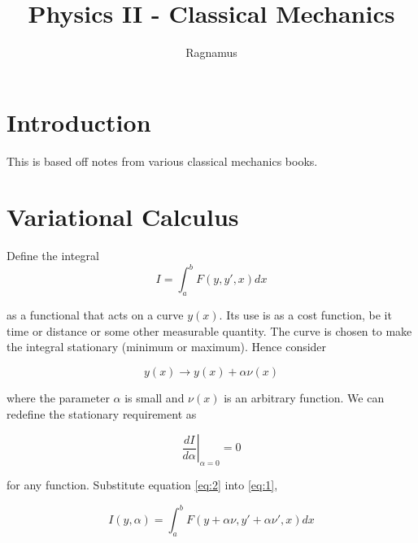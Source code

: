 \documentclass{tufte-book}
\title{Physics II - Classical Mechanics}
\author{Ragnamus}
\newcommand{\blankpage}{\newpage\hbox{}\thispagestyle{empty}\newpage}
\begin{document}
\frontmatter

\blankpage




\maketitle



\tableofcontents

\listoffigures

\listoftables


\cleardoublepage
\chapter*{Introduction}
This is based off notes from various classical mechanics books.

\mainmatter


\chapter{Variational Calculus}
Define the integral
\begin{equation}
	\label{eq:1}
	I = \int^b_a F(y,y',x)dx
\end{equation}

as a functional that acts on a curve $y(x)$. Its use is as a cost function, be it time or distance or some other measurable quantity. The curve is chosen to make the integral stationary (minimum or maximum). Hence consider

\begin{equation}
	\label{eq:2}
	y(x) \rightarrow y(x) + \alpha\nu(x)
\end{equation}

where the parameter $\alpha$ is small and $\nu(x)$ is an arbitrary function. We can redefine the stationary requirement as

\begin{equation}
	\label{eq:3}
	\left.\frac{dI}{d\alpha}\right|_{\alpha=0} = 0
\end{equation}

for any function. Substitute equation \ref{eq:2} into \ref{eq:1},

\begin{equation}
	\label{eq:4}
	I(y,\alpha) = \int^b_a F(y+\alpha\nu, y'+\alpha\nu',x)dx
\end{equation}
\end{document}
